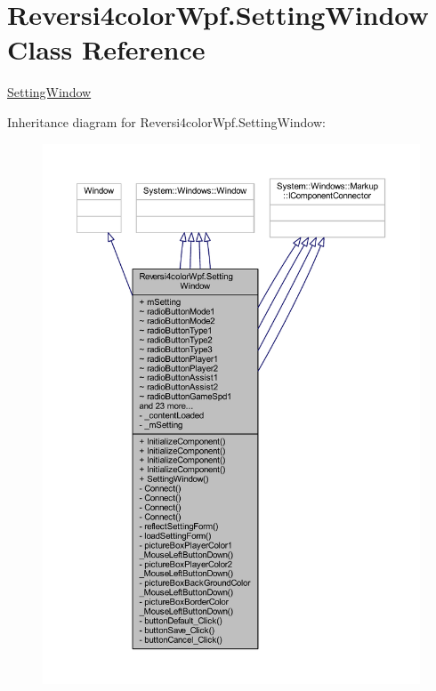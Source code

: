 \hypertarget{class_reversi4color_wpf_1_1_setting_window}{}\section{Reversi4color\+Wpf.\+Setting\+Window Class Reference}
\label{class_reversi4color_wpf_1_1_setting_window}


\hyperlink{class_reversi4color_wpf_1_1_setting_window}{Setting\+Window}  




Inheritance diagram for Reversi4color\+Wpf.\+Setting\+Window\+:
\nopagebreak
\begin{figure}[H]
\begin{center}
\leavevmode
\includegraphics[width=350pt]{class_reversi4color_wpf_1_1_setting_window__inherit__graph}
\end{center}
\end{figure}


